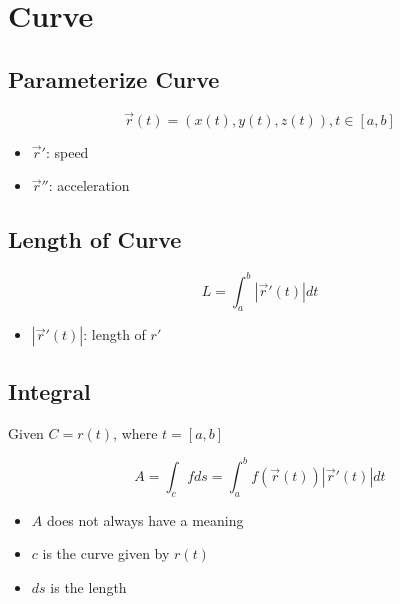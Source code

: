 \section{Curve}

  \subsection{Parameterize Curve}

    \begin{equation}
      \vec{r}\left( t \right) = \left( x(t), y(t), z(t) \right), t \in \left[ a, b \right]
    \end{equation}

    \begin{itemize}
      \item $ \vec{r}' $: speed
      \item $ \vec{r}'' $: acceleration
    \end{itemize}

  \subsection{Length of Curve}

    \begin{equation}
      L = \int_{a}^{b} \left| \vec{r}'\left( t \right) \right| dt
    \end{equation}

    \begin{itemize}
      \item $ \left| \vec{r}'\left( t \right) \right| $: length of $ r' $
    \end{itemize}

  \subsection{Integral}

    Given $ C = r\left( t \right) $, where $ t = \left[ a, b \right] $

    \begin{equation}
      A = \int_{c} fds = \int_{a}^{b} f\left( \vec{r}(t) \right) \left| \vec{r}'(t) \right| dt
    \end{equation}

    \begin{itemize}
      \item $ A $ does not always have a meaning
      \item $ c $ is the curve given by $ r\left( t \right) $
      \item $ ds $ is the length
    \end{itemize}


